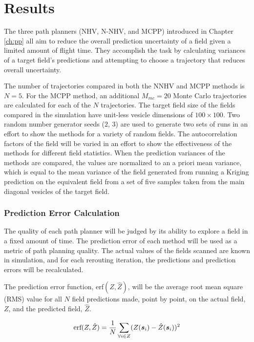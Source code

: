 \chapter{Results}
The three path planners (NHV, N-NHV, and MCPP) introduced in Chapter \ref{ch:pp} all aim to reduce the overall prediction uncertainty of a field given a limited amount of flight time. They accomplish the task by calculating variances of a target field's predictions and attempting to choose a trajectory that reduces overall uncertainty. 

The number of trajectories compared in both the NNHV and MCPP methods is $N=5$. For the MCPP method, an additional $M_{mc}=20$ Monte Carlo trajectories are calculated for each of the $N$ trajectories. The target field size of the fields compared in the simulation have unit-less vesicle dimensions of $100\times 100$. Two random number generator seeds ($2$, $3$) are used to generate two sets of runs in an effort to show the methods for a variety of random fields. The autocorrelation factors of the field will be varied in an effort to show the effectiveness of the methods for different field statistics. When the prediction variances of the methods are compared, the values are normalized to an a priori mean variance, which is equal to the mean variance of the field generated from running a Kriging prediction on the equivalent field from a set of five samples taken from the main diagonal vesicles of the target field.

\subsection{Prediction Error Calculation}
The quality of each path planner will be judged by its ability to explore a field in a fixed amount of time. The prediction error of each method will be used as a metric of path planning quality. The actual values of the fields scanned are known in simulation, and for each rerouting iteration, the predictions and prediction errors will be recalculated.

The prediction error function, erf$(Z,\hat{Z})$, will be the average root mean square (RMS) value for all $N$ field predictions made, point by point, on the actual field, $Z$, and the predicted field, $\hat{Z}$.

\begin{equation}
\text{erf}(Z, \hat{Z}) = \frac{1}{N}\sum_{\forall i \in Z} (Z({\it{\boldsymbol{s}}}_i) - \hat{Z}({\it{\boldsymbol{s}}}_i))^2
\end{equation}

